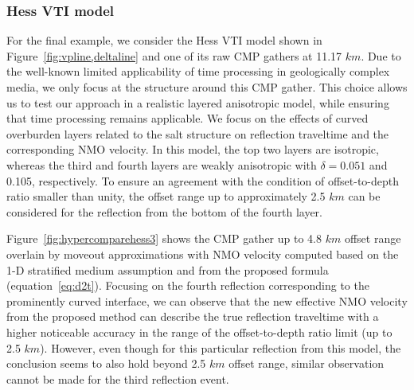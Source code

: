 
\subsubsection{Hess VTI model}

For the final example, we consider the Hess VTI model shown in Figure~\ref{fig:vpline,deltaline} and one of its raw CMP gathers at 11.17 $km$. Due to the well-known limited applicability of time processing in geologically complex media, we only focus at the structure around this CMP gather. This choice allows us to test our approach in a realistic layered anisotropic model, while ensuring that time processing remains applicable. We focus on the effects of curved overburden layers related to the salt structure on reflection traveltime and the corresponding NMO velocity. In this model, the top two layers are isotropic, whereas the third and fourth layers are weakly anisotropic with $\delta=0.051$ and 0.105, respectively. To ensure an agreement with the condition of offset-to-depth ratio smaller than unity, the offset range up to approximately 2.5 $km$ can be considered for the reflection from the bottom of the fourth layer.


Figure~\ref{fig:hypercomparehess3} shows the CMP gather up to 4.8 $km$ offset range overlain by moveout approximations with NMO velocity computed based on the 1-D stratified medium assumption and from the proposed formula (equation~\ref{eq:d2t}). Focusing on the fourth reflection corresponding to the prominently curved interface, we can observe that the new effective NMO velocity from the proposed method can describe the true reflection traveltime with a higher noticeable accuracy in the range of the offset-to-depth ratio limit (up to 2.5 $km$). However, even though for this particular reflection from this model, the conclusion seems to also hold beyond 2.5 $km$ offset range, similar observation cannot be made for the third reflection event.

